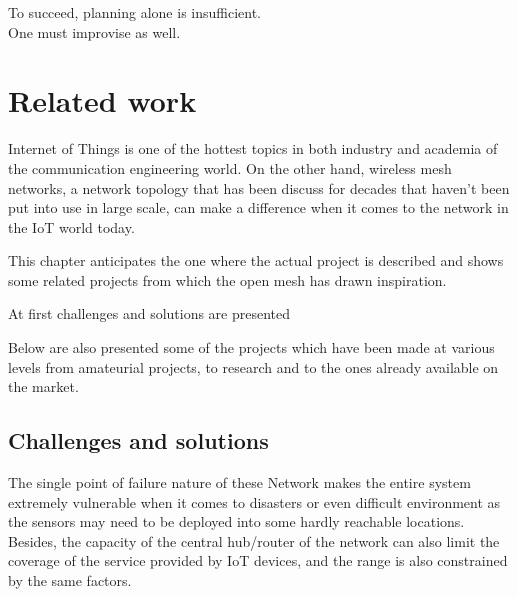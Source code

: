 
\begin{savequote}[70mm]
	To succeed, planning alone is insufficient.\\One must improvise as well.
\end{savequote}


\chapter{Related work}\label{chapter:related_work}

	Internet  of  Things  is  one  of  the  hottest  topics  in 
	both  industry  and  academia  of  the  communication  engineering 
	world.
	On  the  other  hand,  wireless  mesh  networks,  a  network 
	topology that has been discuss for decades that haven’t been put 
	into use in large scale, can make a difference when it comes to the 
	network  in  the  IoT  world  today.

	This chapter anticipates the one where the actual project is described and shows some related projects from which the open mesh has drawn inspiration.
	
	At first challenges and solutions are presented
	
	Below are also presented some of the projects which have been made at various levels from amateurial projects, to research and to the ones already available on the market.
	
	\section{Challenges and solutions}
		
	
		The  single  point  of  failure  nature  of  these  
		Network makes the entire system extremely vulnerable when it 
		comes to disasters or even difficult environment as the sensors 
		may need to be deployed into some hardly reachable locations.
		Besides,  the  capacity  of  the  central  hub/router  of  the  network  
		can  also  limit  the  coverage  of  the  service  provided  by  IoT  
		devices,  and the range is  also constrained by  the  same  factors.
	
